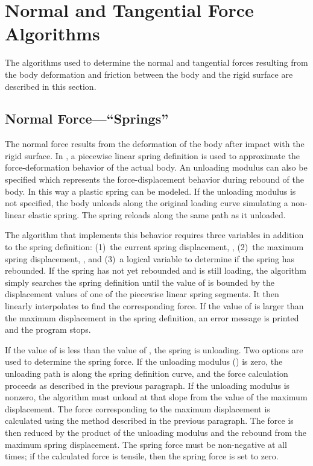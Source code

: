 \section{Normal and Tangential Force Algorithms}
The algorithms used to determine the normal and tangential forces
resulting from the body deformation and friction between the body and
the rigid surface are described in this section.

\subsection{Normal Force---``Springs''}
The normal force results from the deformation of the body after impact
with the rigid surface.  In \SLAP, a piecewise linear spring
definition is used to approximate the force-deformation behavior of
the actual body.  An unloading modulus can also be specified which
represents the force-displacement behavior during rebound of the body.
In this way a plastic spring can be modeled. If the unloading modulus
is not specified, the body unloads along the original loading curve
simulating a non-linear elastic spring.  The spring reloads along
the same path as it unloaded.

The algorithm that implements this behavior requires three variables
in addition to the spring definition: (1)~the current spring
displacement, , (2)~the maximum spring displacement,
, and (3)~a logical variable to determine if the spring
has rebounded.  If the spring has not yet rebounded and is still
loading, the algorithm simply searches the spring definition until the
value of  is bounded by the displacement values of one of
the piecewise linear spring segments.  It then linearly interpolates
to find the corresponding force.  If the value of  is larger
than the maximum displacement in the spring definition, an error
message is printed and the program stops.

If the value of  is less than the value of , the
spring is unloading.  Two options are used to determine the spring
force.  If the unloading modulus () is zero, the unloading
path is along the spring definition curve, and the force calculation
proceeds as described in the previous paragraph.  If the unloading
modulus is nonzero, the algorithm must unload at that slope from the
value of the maximum displacement.  The force corresponding to the
maximum displacement  is calculated using the method
described in the previous paragraph.  The force is then reduced by the
product of the unloading modulus and the rebound from the maximum
spring displacement.  The spring force must be non-negative at all
times; if the calculated force is tensile, then the spring force is
set to zero.

